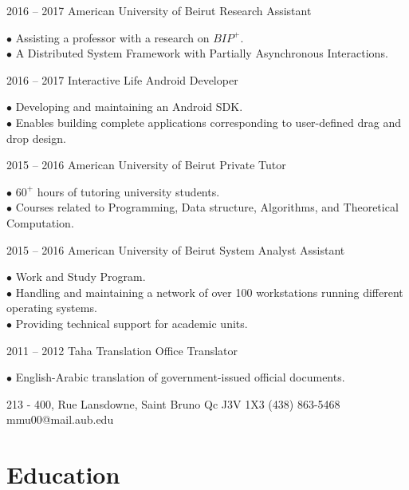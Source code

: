 \documentclass{tccv}
\begin{document}
\begin{eventlist}

\item{2016 -- 2017}
     {American University of Beirut}
     {Research Assistant}

$\bullet$ Assisting a professor with a research on $BIP^+$.\\
$\bullet$ A Distributed System Framework with Partially Asynchronous Interactions.

\item{2016 -- 2017}
     {Interactive Life}
     {Android Developer}

$\bullet$ Developing and maintaining an Android SDK.\\
$\bullet$ Enables building complete applications corresponding to user-defined drag and drop design.

\item{2015 -- 2016}
     {American University of Beirut}
     {Private Tutor}

$\bullet$ $60^+$ hours of tutoring university students.\\
$\bullet$ Courses related to Programming, Data structure, Algorithms, and Theoretical Computation.

\item{2015 -- 2016}
     {American University of Beirut}
     {System Analyst Assistant}

$\bullet$ Work and Study Program.\\
$\bullet$ Handling and maintaining a network of over 100 workstations running different operating systems. \\
$\bullet$ Providing technical support for academic units.

\item{2011 -- 2012}
     {Taha Translation Office}
     {Translator}

$\bullet$ English-Arabic translation of government-issued official documents.

\end{eventlist}



\personal
    {213 - 400,  Rue Lansdowne, Saint Bruno \hspace{1cm} Qc J3V 1X3}
    {(438) 863-5468}
    {mmu00@mail.aub.edu}

\section{Education}
\end{document}
